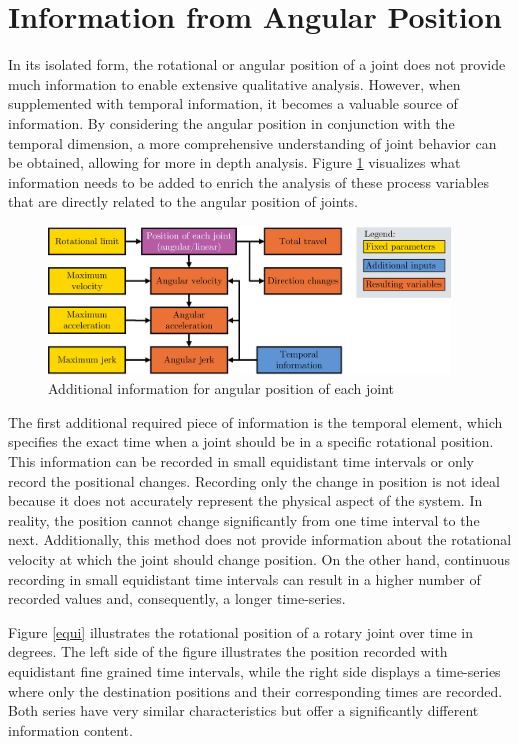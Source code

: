 \section{Information from Angular Position}
In its isolated form, the rotational or angular position of a joint does not provide much information to enable extensive qualitative analysis. However, when supplemented with temporal information, it becomes a valuable source of information. By considering the angular position in conjunction with the temporal dimension, a more comprehensive understanding of joint behavior can be obtained, allowing for more in depth analysis. Figure \ref{agularstuff} visualizes what information needs to be added to enrich the analysis of these process variables that are directly related to the angular position of joints.

\begin{figure}[H]
	\centerline{\includegraphics[width=0.95\textwidth]{figures/angularstuff.png}}
	\caption{Additional information for angular position of each joint}
	\label{agularstuff}
\end{figure}

The first additional required piece of information is the temporal element, which specifies the exact time when a joint should be in a specific rotational position. This information can be recorded in small equidistant time intervals or only record the positional changes. Recording only the change in position is not ideal because it does not accurately represent the physical aspect of the system. In reality, the position cannot change significantly from one time interval to the next. Additionally, this method does not provide information about the rotational velocity at which the joint should change position. On the other hand, continuous recording in small equidistant time intervals can result in a higher number of recorded values and, consequently, a longer time-series.

Figure \ref{equi} illustrates the rotational position of a rotary joint over time in degrees. The left side of the figure illustrates the position recorded with equidistant fine grained time intervals, while the right side displays a time-series where only the destination positions and their corresponding times are recorded. Both series have very similar characteristics but offer a significantly different information content.
\newpage

